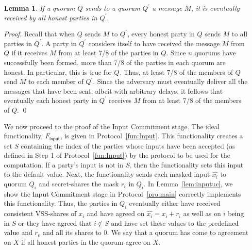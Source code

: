\documentclass[11pt,letter]{article}
\newcommand{\func}[1]{\mbox{$F_\textsf{#1}$}}
\newcommand{\mask}[1]{\widehat{#1}}
\theoremstyle{mytheoremstyle}
\newtheorem{lemma}{Lemma}
\newcommand{\fgoodq}{7/8\xspace}
\begin{document}
\begin{lemma}\label{lem:qcomm}
	If a quorum $Q$ sends to a quorum $Q^\prime$ a message $M$, it is eventually received by all honest parties in $Q^\prime$.
\end{lemma}
\begin{proof} 
	Recall that when $Q$ sends $M$ to $Q^\prime$, every honest party in $Q$ sends $M$ to all parties in $Q^\prime$. A party in $Q^\prime$ considers itself to have received the message $M$ from $Q$ if it receives $M$ from at least \fgoodq of the parties in $Q$. Since $n$ quorums have successfully been formed, more than \fgoodq of the parties in each quorum are honest.
	In particular, this is true for $Q$. Thus, at least \fgoodq of the members of $Q$ send $M$ to each member of $Q^\prime$.
	Since the adversary must eventually deliver all the messages that have been sent, albeit with arbitrary delays, it follows that eventually each honest party in $Q^\prime$ receives $M$ from at least \fgoodq of the members of $Q$.
	\qed
\end{proof}

We now proceed to the proof of the Input Commitment stage. The ideal functionality, \func{Input}, is given in Protocol~\ref{fun:Input}. This functionality creates a set $S$ containing the index of the parties whose inputs have been accepted (as defined in Step 1 of Protocol~\ref{fun:Input}) by the protocol to be used for the computation. If a party's input is not in $S$, then the functionality sets this input to the default value. Next, the functionality sends each masked input $\mask{x_i}$ to quorum $Q_i$ and secret-shares the mask $r_i$ in $Q_i$. In Lemma~\ref{lem:inputuc}, we show the Input Commitment stage in Protocol~\ref{pro:main} correctly implements this functionality. Thus, the parties in $Q_i$ eventually either have received consistent VSS-shares of $x_i$ and have agreed on $\mask{x_i} = x_i+r_i$ as well as on $i$ being in $S$ or they have agreed that $i \notin S$ and have set these values to the predefined value and $r_v$ and all its shares to 0.
We say that a quorum has come to agreement on $X$ if all honest parties in the quorum agree on $X$.
\end{document}
